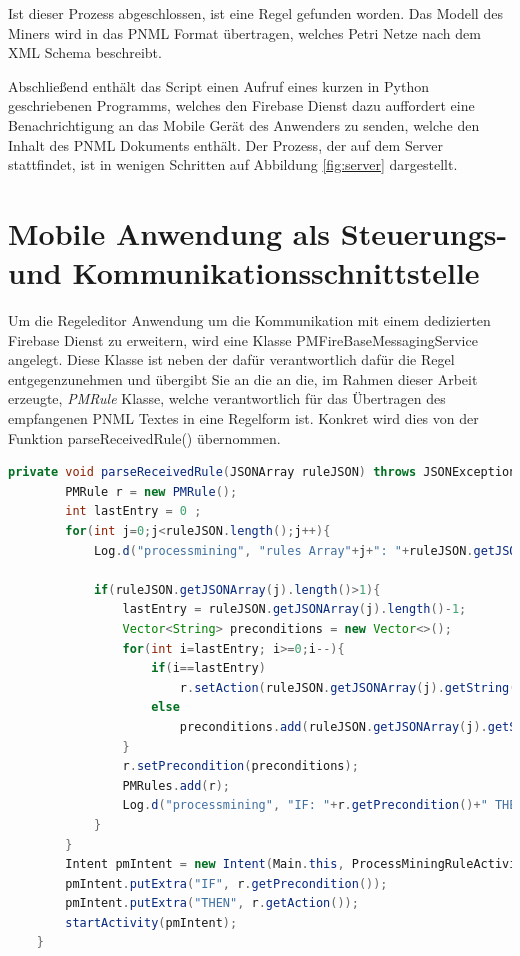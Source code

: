 Ist dieser Prozess abgeschlossen, ist eine Regel gefunden worden.
Das Modell des Miners wird in das PNML Format übertragen, welches Petri Netze nach dem XML Schema beschreibt.

Abschließend enthält das Script einen Aufruf eines kurzen in Python geschriebenen Programms, welches den Firebase Dienst dazu auffordert eine Benachrichtigung an das Mobile Gerät des Anwenders zu senden, welche den Inhalt des PNML Dokuments enthält. Der Prozess, der auf dem Server stattfindet, ist in wenigen Schritten auf Abbildung  \ref{fig:server} dargestellt.

\section{Mobile Anwendung als Steuerungs- und Kommunikationsschnittstelle}

Um die Regeleditor Anwendung um die Kommunikation mit einem dedizierten Firebase Dienst zu erweitern, wird eine Klasse PMFireBaseMessagingService angelegt. Diese Klasse ist neben der dafür verantwortlich dafür die Regel entgegenzunehmen und übergibt Sie an die an die, im Rahmen dieser Arbeit erzeugte, \textit{PMRule} Klasse, welche verantwortlich für das Übertragen des empfangenen PNML Textes in eine Regelform ist. Konkret wird dies von der Funktion parseReceivedRule() übernommen.
\small
\begin{lstlisting}[language=Java]
       private void parseReceivedRule(JSONArray ruleJSON) throws JSONException {
        PMRule r = new PMRule();
        int lastEntry = 0 ;
        for(int j=0;j<ruleJSON.length();j++){
            Log.d("processmining", "rules Array"+j+": "+ruleJSON.getJSONArray(j));

            if(ruleJSON.getJSONArray(j).length()>1){
                lastEntry = ruleJSON.getJSONArray(j).length()-1;
                Vector<String> preconditions = new Vector<>();
                for(int i=lastEntry; i>=0;i--){
                    if(i==lastEntry)
                        r.setAction(ruleJSON.getJSONArray(j).getString(i));
                    else
                        preconditions.add(ruleJSON.getJSONArray(j).getString(i));
                }
                r.setPrecondition(preconditions);
                PMRules.add(r);
                Log.d("processmining", "IF: "+r.getPrecondition()+" THEN: "+r.getAction());
            }
        }
        Intent pmIntent = new Intent(Main.this, ProcessMiningRuleActivity.class);
        pmIntent.putExtra("IF", r.getPrecondition());
        pmIntent.putExtra("THEN", r.getAction());
        startActivity(pmIntent);
    }
\end{lstlisting}

